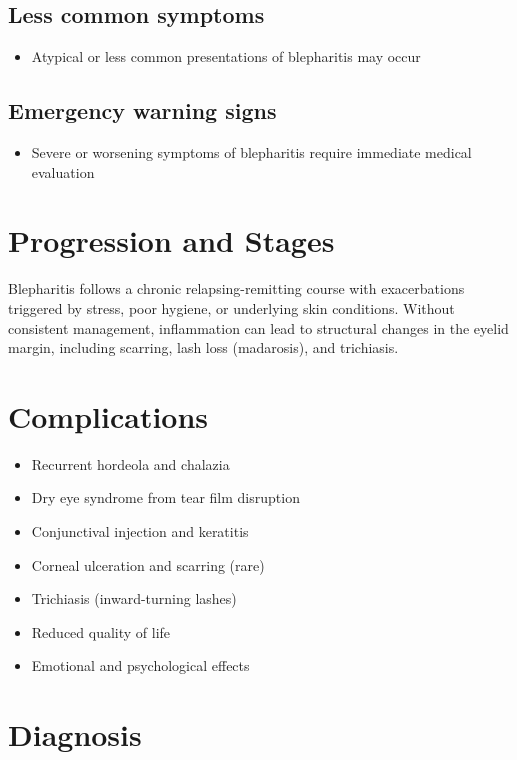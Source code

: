 \subsection{Less common symptoms}
\begin{itemize}[noitemsep]
  \item Atypical or less common presentations of blepharitis may occur
\end{itemize}

\subsection{Emergency warning signs}
\begin{itemize}[noitemsep]
  \item Severe or worsening symptoms of blepharitis require immediate medical evaluation
\end{itemize}
\section{Progression and Stages}
Blepharitis follows a chronic relapsing-remitting course with exacerbations triggered by stress, poor hygiene, or underlying skin conditions. Without consistent management, inflammation can lead to structural changes in the eyelid margin, including scarring, lash loss (madarosis), and trichiasis.

\section{Complications}

\begin{itemize}[noitemsep]
  \item Recurrent hordeola and chalazia
  \item Dry eye syndrome from tear film disruption
  \item Conjunctival injection and keratitis
  \item Corneal ulceration and scarring (rare)
  \item Trichiasis (inward-turning lashes)
  \item Reduced quality of life
  \item Emotional and psychological effects
\end{itemize}

\section{Diagnosis}

